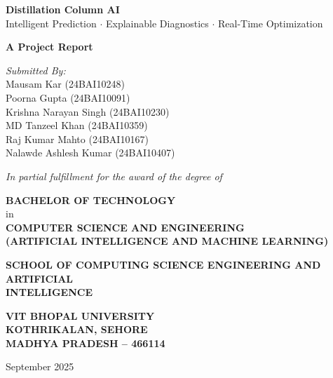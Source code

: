\documentclass[12pt,a4paper]{report}
\begin{document}

\begin{titlepage}
\begin{center}

\vspace*{0.5cm}
{\LARGE\bfseries Distillation Column AI}\\[6pt]
{\large Intelligent Prediction $\cdot$ Explainable Diagnostics $\cdot$ Real-Time Optimization}

\vspace{1.2cm}
{\Large\bfseries A Project Report}

\vspace{0.8cm}
{\large\itshape Submitted By:}\\[6pt]
{\large
Mausam Kar (24BAI10248)\\
Poorna Gupta (24BAI10091)\\
Krishna Narayan Singh (24BAI10230)\\
MD Tanzeel Khan (24BAI10359)\\
Raj Kumar Mahto (24BAI10167)\\
Nalawde Ashlesh Kumar (24BAI10407)\\
}

\vspace{0.8cm}
{\itshape In partial fulfillment for the award of the degree of}

\vspace{0.4cm}
{\large\bfseries BACHELOR OF TECHNOLOGY}\\[4pt]
{\normalsize in}\\[4pt]
{\large\bfseries COMPUTER SCIENCE AND ENGINEERING}\\[4pt]
{\large\bfseries (ARTIFICIAL INTELLIGENCE AND MACHINE LEARNING)}

\vspace{0.8cm}

\vspace{0.6cm}
{\large\bfseries SCHOOL OF COMPUTING SCIENCE ENGINEERING AND ARTIFICIAL\\[2pt]
INTELLIGENCE}

\vspace{0.4cm}
{\bfseries
VIT BHOPAL UNIVERSITY\\
KOTHRIKALAN, SEHORE\\
MADHYA PRADESH -- 466114
}

\vspace{0.5cm}
{\large September 2025}

\end{center}
\end{titlepage}
\end{document}
